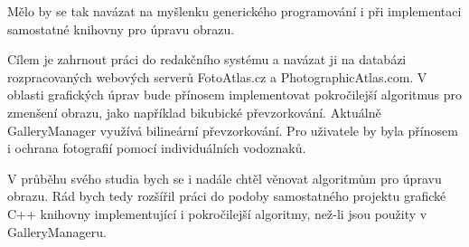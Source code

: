 \documentclass[11pt,twoside,a4paper]{book}
\begin{document}
\indent
Mělo by se tak navázat na myšlenku generického programování i při implementaci samostatné knihovny pro úpravu obrazu.

\indent
Cílem je zahrnout práci do redakčního systému a navázat ji na databázi rozpracovaných webových serverů FotoAtlas.cz a PhotographicAtlas.com. V oblasti grafických úprav bude přínosem implementovat pokročilejší algoritmus pro zmenšení obrazu, jako například bikubické převzorkování. Aktuálně GalleryManager využívá bilineární převzorkování. Pro uživatele by byla přínosem i ochrana fotografií pomocí individuálních vodoznaků.

\indent
V průběhu svého studia bych se i nadále chtěl věnovat algoritmům pro úpravu obrazu. Rád bych tedy rozšířil práci do podoby samostatného projektu grafické C++ knihovny implementující i pokročilejší algoritmy, než-li jsou použity v GalleryManageru.

\nocite{boostgil}
\nocite{exif}
\nocite{git}
\nocite{libexif}
\nocite{qt}
\nocite{stl}
\nocite{jpeg}
\nocite{wiki:rotation}
\nocite{wiki:affine}
\nocite{wiki:bilinear}
\nocite{wiki:latex}
\nocite{colorhandbook}
\nocite{doxygen}





%




%

\appendix
\end{document}
